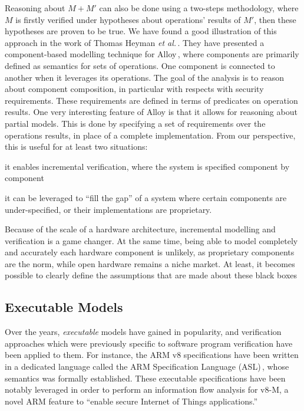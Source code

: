 Reasoning about $M + M'$ can also be done using a two-steps methodology, where
$M$ is firstly verified under hypotheses about operations' results of $M'$, then
these hypotheses are proven to be true.
%
We have found a good illustration of this approach in the work of Thomas Heyman
\emph{et al.}\,\cite{heyman2012securemodel}.
%
They have presented a component-based modelling technique for
Alloy\,\cite{jackson2012alloy}, where components are primarily defined as
semantics for sets of operations.
%
One component is connected to another when it leverages its operations.
%
The goal of the analysis is to reason about component composition, in particular
with respects with security requirements.
%
These requirements are defined in terms of predicates on operation results.
%
One very interesting feature of Alloy is that it allows for reasoning about
partial models.
%
This is done by specifying a set of requirements over the operations results, in
place of a complete implementation.
%
From our perspective, this is useful for at least two situations:
%
\begin{inparaenum}[(1)]
\item it enables incremental verification, where the system is specified
  component by component
%
\item it can be leveraged to ``fill the gap'' of a system where certain
  components are under-specified, or their implementations are proprietary.
%
\end{inparaenum}
%
Because of the scale of a hardware architecture, incremental modelling and
verification is a game changer.
%
At the same time, being able to model completely and accurately each hardware
component is unlikely, as proprietary components are the norm, while open
hardware remains a niche market.
%
At least, it becomes possible to clearly define the assumptions that are made
about these black boxes

\subsection{Executable Models}
\label{subsec:related:ease:exec}
%
Over the years, \emph{executable} models have gained in popularity, and
verification approaches which were previously specific to software program
verification have been applied to them.
%
For instance, the ARM v8 specifications have been written in a dedicated
language called the ARM Specification Language (ASL)\,\cite{reid2016armv8},
whose semantics was formally established.
%
These executable specifications have been notably leveraged in order to perform
an information flow analysis for v8-M, a novel ARM feature to ``enable secure
Internet of Things applications.''

